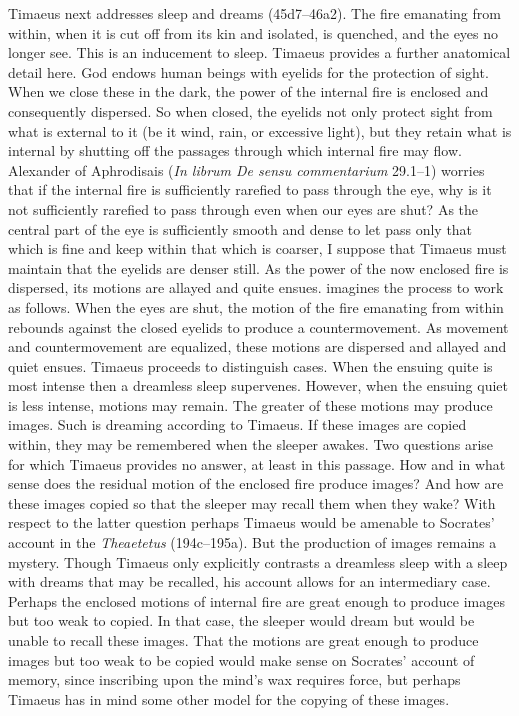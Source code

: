Timaeus next addresses sleep and dreams (45d7--46a2). The fire emanating from within, when it is cut off from its kin and isolated, is quenched, and the eyes no longer see. This is an inducement to sleep. Timaeus provides a further anatomical detail here. God endows human beings with eyelids for the protection of sight. When we close these in the dark, the power of the internal fire is enclosed and consequently dispersed. So when closed, the eyelids not only protect sight from what is external to it (be it wind, rain, or excessive light), but they retain what is internal by shutting off the passages through which internal fire may flow. Alexander of Aphrodisais (\emph{In librum De sensu commentarium} 29.1--1) worries that if the internal fire is sufficiently rarefied to pass through the eye, why is it not sufficiently rarefied to pass through even when our eyes are shut? As the central part of the eye is sufficiently smooth and dense to let pass only that which is fine and keep within that which is coarser, I suppose that Timaeus must maintain that the eyelids are denser still. As the power of the now enclosed fire is dispersed, its motions are allayed and quite ensues. \citet[282--3]{Taylor:1928qb} imagines the process to work as follows. When the eyes are shut, the motion of the fire emanating from within rebounds against the closed eyelids to produce a countermovement. As movement and countermovement are equalized, these motions are dispersed and allayed and quiet ensues. Timaeus proceeds to distinguish cases. When the ensuing quite is most intense then a dreamless sleep supervenes. However, when the ensuing quiet is less intense, motions may remain. The greater of these motions may produce images. Such is dreaming according to Timaeus. If these images are copied within, they may be remembered when the sleeper awakes. Two questions arise for which Timaeus provides no answer, at least in this passage. How and in what sense does the residual motion of the enclosed fire produce images? And how are these images copied so that the sleeper may recall them when they wake? With respect to the latter question perhaps Timaeus would be amenable to Socrates' account in the \emph{Theaetetus} (194c--195a). But the production of images remains a mystery. Though Timaeus only explicitly contrasts a dreamless sleep with a sleep with dreams that may be recalled, his account allows for an intermediary case. Perhaps the enclosed motions of internal fire are great enough to produce images but too weak to copied. In that case, the sleeper would dream but would be unable to recall these images. That the motions are great enough to produce images but too weak to be copied would make sense on Socrates' account of memory, since inscribing upon the mind's wax requires force, but perhaps Timaeus has in mind some other model for the copying of these images. 

